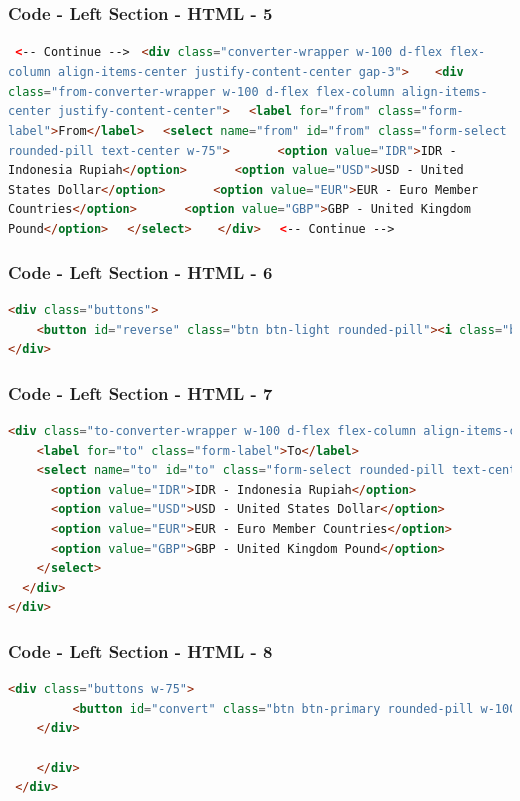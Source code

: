 \documentclass[aspectratio=169, table]{beamer}
\begin{document}
\begin{frame}[fragile]
    \frametitle{Code - Left Section - HTML - 5}
    \vskip1cm
    \lstinline[language=HTML]! <-- Continue --> !
    \lstinline[language=HTML]!<div class="converter-wrapper w-100 d-flex flex-column align-items-center justify-content-center gap-3">!
    \lstinline[language=HTML]!   <div class="from-converter-wrapper w-100 d-flex flex-column align-items-center justify-content-center">!
    \lstinline[language=HTML]!	<label for="from" class="form-label">From</label>!
    \lstinline[language=HTML]!	<select name="from" id="from" class="form-select rounded-pill text-center w-75">!
    \lstinline[language=HTML]!		<option value="IDR">IDR - Indonesia Rupiah</option>!
    \lstinline[language=HTML]!		<option value="USD">USD - United States Dollar</option>!
    \lstinline[language=HTML]!		<option value="EUR">EUR - Euro Member Countries</option>!
    \lstinline[language=HTML]!		<option value="GBP">GBP - United Kingdom Pound</option>!
    \lstinline[language=HTML]!	</select>!
    \lstinline[language=HTML]!   </div>!
    \lstinline[language=HTML]!  <-- Continue --> !
\end{frame}

\begin{frame}[fragile]
    \frametitle{Code - Left Section - HTML - 6}
    \vskip1cm
    \begin{lstlisting}[language=HTML]
<div class="buttons">
    <button id="reverse" class="btn btn-light rounded-pill"><i class="bi bi-arrow-down-up"></i></button>
</div>
    \end{lstlisting}
\end{frame}

\begin{frame}[fragile]
    \frametitle{Code - Left Section - HTML - 7}
    \vskip1cm
    \begin{lstlisting}[language=HTML]
<div class="to-converter-wrapper w-100 d-flex flex-column align-items-center justify-content-center">
    <label for="to" class="form-label">To</label>
    <select name="to" id="to" class="form-select rounded-pill text-center w-75">
      <option value="IDR">IDR - Indonesia Rupiah</option>
      <option value="USD">USD - United States Dollar</option>
      <option value="EUR">EUR - Euro Member Countries</option>
      <option value="GBP">GBP - United Kingdom Pound</option>
    </select>
  </div>
</div>
    \end{lstlisting}
\end{frame}


\begin{frame}[fragile]
    \frametitle{Code - Left Section - HTML - 8}
    \vskip1cm
    \begin{lstlisting}[language=HTML]
	<div class="buttons w-75">
	     <button id="convert" class="btn btn-primary rounded-pill w-100">Convert</button>
	</div>

    </div>
 </div>
    \end{lstlisting}
\end{frame}
\end{document}
